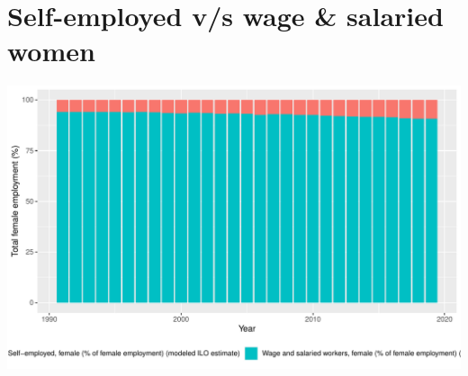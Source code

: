 \documentclass[11pt,a4paper,]{article}
\newenvironment{Shaded}{\begin{snugshade}}{\end{snugshade}}
\newcommand{\DataTypeTok}[1]{\textcolor[rgb]{0.13,0.29,0.53}{#1}}
\newcommand{\DecValTok}[1]{\textcolor[rgb]{0.00,0.00,0.81}{#1}}
\newcommand{\KeywordTok}[1]{\textcolor[rgb]{0.13,0.29,0.53}{\textbf{#1}}}
\newcommand{\NormalTok}[1]{#1}
\newcommand{\OperatorTok}[1]{\textcolor[rgb]{0.81,0.36,0.00}{\textbf{#1}}}
\newcommand{\StringTok}[1]{\textcolor[rgb]{0.31,0.60,0.02}{#1}}
\let\origfigure\figure
\let\endorigfigure\endfigure
\renewenvironment{figure}[1][2] {
    \expandafter\origfigure\expandafter[H]
} {
    \endorigfigure
}%
\begin{document}
\hypertarget{self-employed-vs-wage-salaried-women}{%
\section{Self-employed v/s wage \& salaried women}\label{self-employed-vs-wage-salaried-women}}

\begin{Shaded}
\end{Shaded}

\begin{figure}
\centering
\includegraphics{report_files/figure-latex/graph2-1.pdf}
\caption{\label{fig:graph2}Self-employed v/s Wage \& salaried female workers}
\end{figure}
\end{document}
